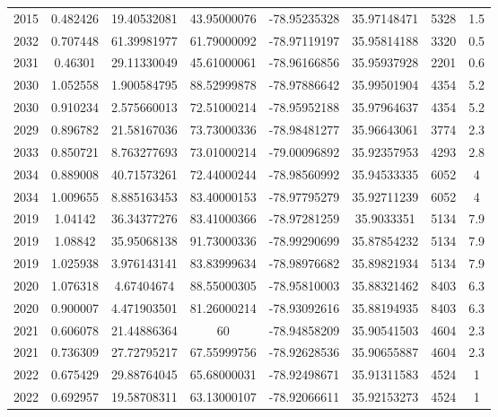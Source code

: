 \documentclass[11pt]{article}
\begin{document}
\begin{longtable*}{|c|c|c|c|c|c|c|c|}
2015  & 0.482426       & 19.40532081       & 43.95000076    & -78.95235328 & 35.97148471 & 5328       & 1.5  \\
2032  & 0.707448       & 61.39981977       & 61.79000092    & -78.97119197 & 35.95814188 & 3320       & 0.5  \\
2031  & 0.46301        & 29.11330049       & 45.61000061    & -78.96166856 & 35.95937928 & 2201       & 0.6  \\
2030  & 1.052558       & 1.900584795       & 88.52999878    & -78.97886642 & 35.99501904 & 4354       & 5.2  \\
2030  & 0.910234       & 2.575660013       & 72.51000214    & -78.95952188 & 35.97964637 & 4354       & 5.2  \\
2029  & 0.896782       & 21.58167036       & 73.73000336    & -78.98481277 & 35.96643061 & 3774       & 2.3  \\
2033  & 0.850721       & 8.763277693       & 73.01000214    & -79.00096892 & 35.92357953 & 4293       & 2.8  \\
2034  & 0.889008       & 40.71573261       & 72.44000244    & -78.98560992 & 35.94533335 & 6052       & 4    \\
2034  & 1.009655       & 8.885163453       & 83.40000153    & -78.97795279 & 35.92711239 & 6052       & 4    \\
2019  & 1.04142        & 36.34377276       & 83.41000366    & -78.97281259 & 35.9033351  & 5134       & 7.9  \\
2019  & 1.08842        & 35.95068138       & 91.73000336    & -78.99290699 & 35.87854232 & 5134       & 7.9  \\
2019  & 1.025938       & 3.976143141       & 83.83999634    & -78.98976682 & 35.89821934 & 5134       & 7.9  \\
2020  & 1.076318       & 4.67404674        & 88.55000305    & -78.95810003 & 35.88321462 & 8403       & 6.3  \\
2020  & 0.900007       & 4.471903501       & 81.26000214    & -78.93092616 & 35.88194935 & 8403       & 6.3  \\
2021  & 0.606078       & 21.44886364       & 60             & -78.94858209 & 35.90541503 & 4604       & 2.3  \\
2021  & 0.736309       & 27.72795217       & 67.55999756    & -78.92628536 & 35.90655887 & 4604       & 2.3  \\
2022  & 0.675429       & 29.88764045       & 65.68000031    & -78.92498671 & 35.91311583 & 4524       & 1    \\
2022  & 0.692957       & 19.58708311       & 63.13000107    & -78.92066611 & 35.92153273 & 4524       & 1    \\

\end{longtable*}
\end{document}
